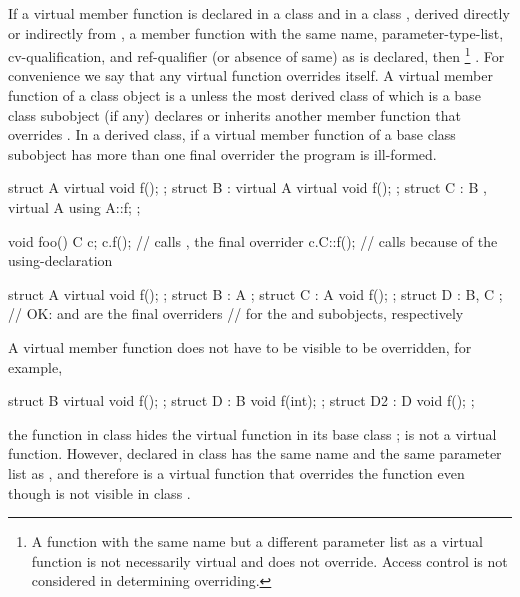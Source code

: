 \pnum
If a virtual member function  is declared in a class
 and in a class , derived directly or
indirectly from , a member function  with the same
name, parameter-type-list, cv-qualification, and ref-qualifier
(or absence of same) as  is declared,
then  \footnote{A function
with the same name but a different parameter list
as a virtual function is not necessarily virtual and
does not override. Access control is not considered in
determining overriding.}
. For convenience we say that any virtual function
overrides itself.
%
A virtual member function  of a class object  is a  unless the most derived class of which  is a
base class subobject (if any) declares or inherits another member function that overrides
. In a derived class, if a virtual member function of a base class subobject
has more than one final overrider the program is ill-formed.
\begin{example}
\begin{codeblock}
struct A {
  virtual void f();
};
struct B : virtual A {
  virtual void f();
};
struct C : B , virtual A {
  using A::f;
};

void foo() {
  C c;
  c.f();              // calls , the final overrider
  c.C::f();           // calls  because of the using-declaration
}
\end{codeblock}
\end{example}

\begin{example}
\begin{codeblock}
struct A { virtual void f(); };
struct B : A { };
struct C : A { void f(); };
struct D : B, C { };  // OK:  and  are the final overriders
                      // for the  and  subobjects, respectively
\end{codeblock}
\end{example}

\pnum
\begin{note}
A virtual member function does not have to be visible to be overridden,
for example,
\begin{codeblock}
struct B {
  virtual void f();
};
struct D : B {
  void f(int);
};
struct D2 : D {
  void f();
};
\end{codeblock}
the function  in class  hides the virtual
function  in its base class ;  is
not a virtual function. However,  declared in class
 has the same name and the same parameter list as
, and therefore is a virtual function that overrides the
function  even though  is not visible in
class .
\end{note}

